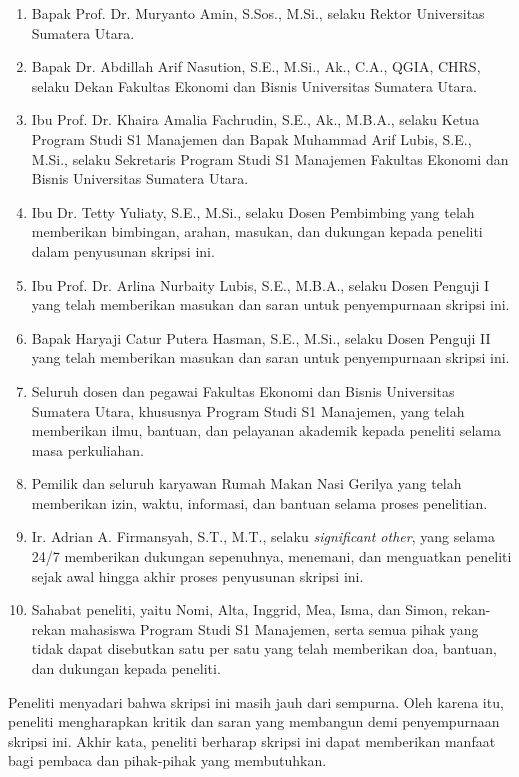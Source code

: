 \begin{katapengantar}
    \begin{enumerate}
        \item Bapak Prof. Dr. Muryanto Amin, S.Sos., M.Si., selaku Rektor Universitas Sumatera Utara.
        \item Bapak Dr. Abdillah Arif Nasution, S.E., M.Si., Ak., C.A., QGIA, CHRS, selaku Dekan Fakultas Ekonomi dan Bisnis Universitas Sumatera Utara.
        \item Ibu Prof. Dr. Khaira Amalia Fachrudin, S.E., Ak., M.B.A., selaku Ketua Program Studi S1 Manajemen dan Bapak Muhammad Arif Lubis, S.E., M.Si., selaku Sekretaris Program Studi S1 Manajemen Fakultas Ekonomi dan Bisnis Universitas Sumatera Utara.
        \item Ibu Dr. Tetty Yuliaty, S.E., M.Si., selaku Dosen Pembimbing yang telah memberikan bimbingan, arahan, masukan, dan dukungan kepada peneliti dalam penyusunan skripsi ini.
        \item Ibu Prof. Dr. Arlina Nurbaity Lubis, S.E., M.B.A., selaku Dosen Penguji I yang telah memberikan masukan dan saran untuk penyempurnaan skripsi ini.
        \item Bapak Haryaji Catur Putera Hasman, S.E., M.Si., selaku Dosen Penguji II yang telah memberikan masukan dan saran untuk penyempurnaan skripsi ini.
        \item Seluruh dosen dan pegawai Fakultas Ekonomi dan Bisnis Universitas Sumatera Utara, khususnya Program Studi S1 Manajemen, yang telah memberikan ilmu, bantuan, dan pelayanan akademik kepada peneliti selama masa perkuliahan.
        \item Pemilik dan seluruh karyawan Rumah Makan Nasi Gerilya yang telah memberikan izin, waktu, informasi, dan bantuan selama proses penelitian.
        \item Ir. Adrian A. Firmansyah, S.T., M.T., selaku \textit{significant other}, yang selama 24/7 memberikan dukungan sepenuhnya, menemani, dan menguatkan peneliti sejak awal hingga akhir proses penyusunan skripsi ini.
        \item Sahabat peneliti, yaitu Nomi, Alta, Inggrid, Mea, Isma, dan Simon, rekan-rekan mahasiswa Program Studi S1 Manajemen, serta semua pihak yang tidak dapat disebutkan satu per satu yang telah memberikan doa, bantuan, dan dukungan kepada peneliti.
    \end{enumerate}

    Peneliti menyadari bahwa skripsi ini masih jauh dari sempurna. Oleh karena itu, peneliti mengharapkan kritik dan saran yang membangun demi penyempurnaan skripsi ini. Akhir kata, peneliti berharap skripsi ini dapat memberikan manfaat bagi pembaca dan pihak-pihak yang membutuhkan.
\end{katapengantar}
